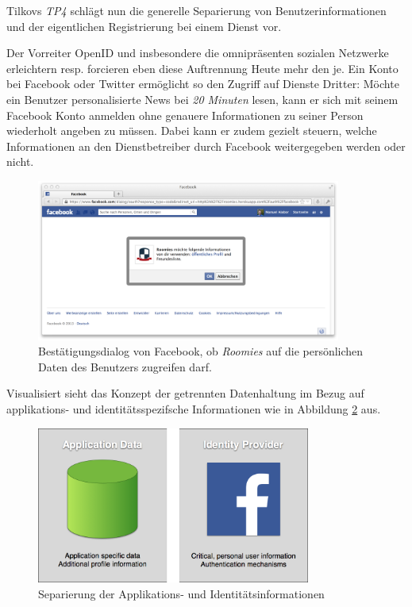 Tilkovs \emph{TP4} schlägt nun die generelle Separierung von Benutzerinformationen und der eigentlichen Registrierung bei einem Dienst vor.

Der Vorreiter OpenID \cite{OpenID} und insbesondere die omnipräsenten sozialen Netzwerke erleichtern resp. forcieren eben diese Auftrennung Heute mehr den je.
\newline\newline
Ein Konto bei Facebook oder Twitter ermöglicht so den Zugriff auf Dienste Dritter: Möchte ein Benutzer personalisierte News bei \emph{20 Minuten} lesen, kann er sich mit seinem Facebook Konto anmelden \cite{20min} ohne genauere Informationen zu seiner Person wiederholt angeben zu müssen. Dabei kann er zudem gezielt steuern, welche Informationen an den Dienstbetreiber durch Facebook weitergegeben werden oder nicht.

\begin{figure}[H]
	\centering
	\includegraphics[width=10cm]{content/principle-demonstration/images/facebook-auth-dialog.png}
	\caption{Bestätigungsdialog von Facebook, ob \emph{Roomies} auf die persönlichen Daten des Benutzers zugreifen darf.}
	\label{fig:facebook-auth-dialog}
\end{figure}


Visualisiert sieht das Konzept der getrennten Datenhaltung im Bezug auf applikations- und identitätsspezifsche Informationen wie in Abbildung \ref{fig:applicationdata-vs-identityprovider} aus.

\begin{figure}[H]
	\centering
	\includegraphics[width=9cm]{content/principle-demonstration/images/applicationdata-vs-identityprovider.png}
	\caption{Separierung der Applikations- und Identitätsinformationen}
	\label{fig:applicationdata-vs-identityprovider}
\end{figure}

